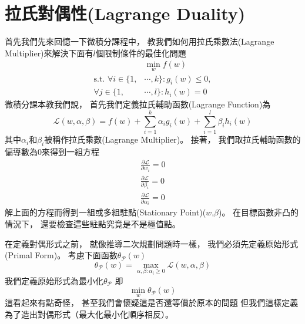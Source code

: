 \section{拉氏對偶性(Lagrange Duality)}
  首先我們先來回憶一下微積分課程中，
  教我們如何用拉氏乘數法(Lagrange Multiplier)來解決下面有$l$個限制條件的最佳化問題
  \begin{equation}
    \begin{split}
      &\min_w f(w) \\
      \text{s.t. } \forall i \in \lbrace 1, &\cdots, k \rbrace: g_i(w) \leq 0, \\
      \forall j \in \lbrace 1, &\cdots, l \rbrace: h_i(w) = 0
    \end{split}
  \end{equation}
  微積分課本教我們說，
  首先我們定義拉氏輔助函數(Lagrange Function)為
  \begin{equation}
    \mathcal{L}(w, \alpha, \beta) = f(w) + \sum_{i=1}^k \alpha_i g_i(w) + \sum_{i=1}^l \beta_i h_i(w)
  \end{equation}
  其中$\alpha_i$和$\beta_i$被稱作拉氏乘數(Lagrange Multiplier)。    
  接著，	
  我們取拉氏輔助函數的偏導數為0來得到一組方程
  \begin{align}
    \frac{\partial \mathcal{L}}{\partial w_i} = 0 \\
    \frac{\partial \mathcal{L}}{\partial \beta_i} = 0 \\
    \frac{\partial \mathcal{L}}{\partial \alpha_i} = 0
  \end{align}
  解上面的方程而得到一組或多組駐點(Stationary Point)($w$,$\beta$)。
  在目標函數非凸的情況下，
  還要檢查這些駐點究竟是不是極值點。

  在定義對偶形式之前，
  就像推導二次規劃問題時一樣，
  我們必須先定義原始形式(Primal Form)。
  考慮下面函數$\theta_{\mathcal{P}}(w)$
  \begin{equation}
    \theta_{\mathcal{P}}(w) = \max_{\alpha, \beta: \alpha_i \geq 0} \mathcal{L}(w, \alpha, \beta)
  \end{equation}    
  我們定義原始形式為最小化$\theta_{\mathcal{P}}$
  即
  \begin{equation}
    \min_w \theta_{\mathcal{P}}(w)
  \end{equation}
  這看起來有點奇怪，
  甚至我們會懷疑這是否還等價於原本的問題
  但我們這樣定義為了造出對偶形式（最大化最小化順序相反）。

